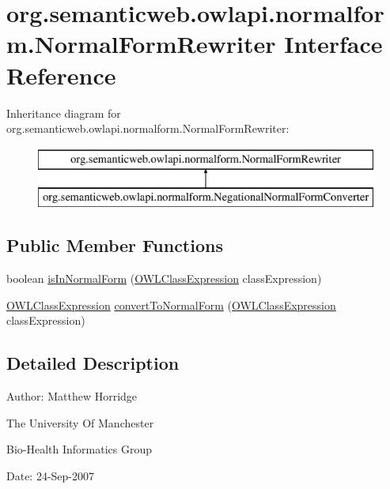 \hypertarget{interfaceorg_1_1semanticweb_1_1owlapi_1_1normalform_1_1_normal_form_rewriter}{\section{org.\-semanticweb.\-owlapi.\-normalform.\-Normal\-Form\-Rewriter Interface Reference}
\label{interfaceorg_1_1semanticweb_1_1owlapi_1_1normalform_1_1_normal_form_rewriter}
}
Inheritance diagram for org.\-semanticweb.\-owlapi.\-normalform.\-Normal\-Form\-Rewriter\-:\begin{figure}[H]
\begin{center}
\leavevmode
\includegraphics[height=2.000000cm]{interfaceorg_1_1semanticweb_1_1owlapi_1_1normalform_1_1_normal_form_rewriter}
\end{center}
\end{figure}
\subsection*{Public Member Functions}
\begin{DoxyCompactItemize}
\item 
boolean \hyperlink{interfaceorg_1_1semanticweb_1_1owlapi_1_1normalform_1_1_normal_form_rewriter_a4774bfdafba874ee1f9abfbe8d7e3747}{is\-In\-Normal\-Form} (\hyperlink{interfaceorg_1_1semanticweb_1_1owlapi_1_1model_1_1_o_w_l_class_expression}{O\-W\-L\-Class\-Expression} class\-Expression)
\item 
\hyperlink{interfaceorg_1_1semanticweb_1_1owlapi_1_1model_1_1_o_w_l_class_expression}{O\-W\-L\-Class\-Expression} \hyperlink{interfaceorg_1_1semanticweb_1_1owlapi_1_1normalform_1_1_normal_form_rewriter_a1bff6115d36bfdd433ba02739a3637ee}{convert\-To\-Normal\-Form} (\hyperlink{interfaceorg_1_1semanticweb_1_1owlapi_1_1model_1_1_o_w_l_class_expression}{O\-W\-L\-Class\-Expression} class\-Expression)
\end{DoxyCompactItemize}


\subsection{Detailed Description}
Author\-: Matthew Horridge\par
 The University Of Manchester\par
 Bio-\/\-Health Informatics Group\par
 Date\-: 24-\/\-Sep-\/2007\par
\par
 

